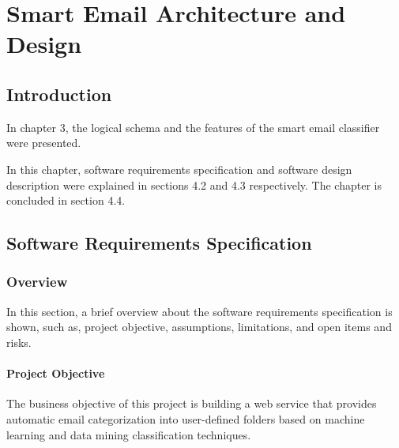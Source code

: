 \newenvironment{my_desc}
{\begin{description}
  \setlength{\itemsep}{0cm}
  \setlength{\parskip}{0cm}}
{\end{description}}

\chapter{Smart Email Architecture and Design} %

\label{Chapter4} %


\section{Introduction}
In chapter 3, the logical schema and the features of the smart email classifier
were presented.

In this chapter, software requirements specification and software design
description were explained in sections 4.2 and 4.3 respectively. The chapter is
concluded in section 4.4.

\section{Software Requirements Specification} %
\subsection{Overview}
In this section, a brief overview about the software requirements specification
is shown, such as, project objective, assumptions, limitations, and open items
and risks.

\subsubsection{Project Objective}
The business objective of this project is building a web service that provides
automatic email categorization into user-defined folders based on machine 
learning and data mining classification techniques.


